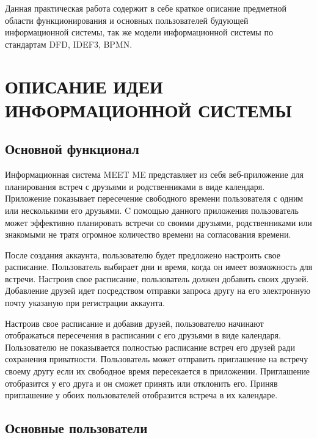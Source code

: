 \documentclass[14pt]{extreport}
\begin{document}
\pagestyle{empty} %



\pagestyle{plain} %
\tableofcontents
\intro\label{intro} 

Данная практическая работа содержит в себе краткое описание предметной области функционирования и основных пользователей будующей информационной системы, так же модели информационной системы по стандартам DFD, IDEF3, BPMN.


\chapter{ОПИСАНИЕ ИДЕИ ИНФОРМАЦИОННОЙ СИСТЕМЫ \label{chapter1}}

\section{Основной функционал}

Информационная система MEET ME представляет из себя веб-приложение для планирования встреч с друзьями и родственниками в виде календаря. 
Приложение показывает пересечение свободного времени пользователя с одним или несколькими его друзьями.
C помощью данного приложения пользователь может эффективно планировать встречи со своими друзьями, родственниками или знакомыми не тратя огромное количество времени на согласования времени. 

После создания аккаунта, пользователю будет предложено настроить свое расписание. Пользователь выбирает дни и время, когда он имеет возможность для встречи. 
Настроив свое расписание, пользователь должен добавить своих друзей.  Добавление друзей идет посредством отправки запроса другу на его электронную почту указаную при регистрации аккаунта.

Настроив свое расписание и добавив друзей, пользователю начинают отображаться пересечения в расписании с его друзьями в виде календаря. Пользователю не показывается полностью расписание встреч его друзей ради сохранения приватности. Пользователь может отправить приглашение на встречу своему другу если их свободное время пересекается в приложении. Приглашение отобразится у его друга и он сможет принять или отклонить его. Приняв приглашение у обоих пользователей отобразится встреча в их календаре. 

\section{Основные пользователи}
\end{document}
